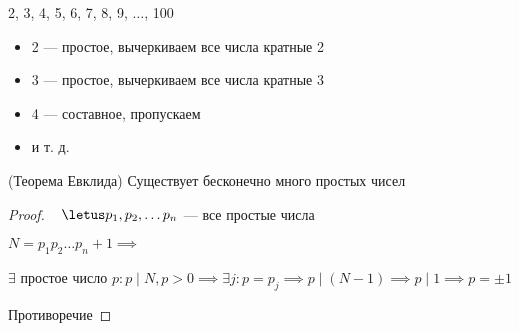 2, 3, 4, 5, 6, 7, 8, 9, $\ldots$, 100

\begin{itemize}
    \item 2 --- простое, вычеркиваем все числа кратные 2
    
    \item 3 --- простое, вычеркиваем все числа кратные 3
    
    \item 4 --- составное, пропускаем
    
    \item и т. д.
\end{itemize}

\begin{theorem}(Теорема Евклида)
    Существует бесконечно много простых чисел
\end{theorem}

\begin{proof}~
    $\letus p_1, p_2, \ldots p_n$ --- все простые числа
    
    $N = p_1 p_2 \ldots p_n + 1 \implies$
    
    $\exists$ простое число $p : p \mid N, p > 0 \implies \exists j: p = p_j \implies p \mid (N - 1) \implies p \mid 1 \implies p = \pm 1$
    
    Противоречие 
\end{proof}
